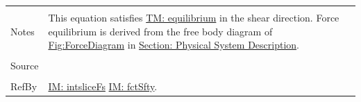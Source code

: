 \documentclass[12pt]{article}
\begin{document}
\begin{minipage}{\textwidth}
\begin{tabular}{p{} p{}}
                                 \\ \midrule \\
                                 Notes & This equation satisfies \hyperref[TM:equilibrium]{TM: equilibrium} in the shear direction. Force equilibrium is derived from the free body diagram of \hyperref[Figure:ForceDiagram]{Fig:ForceDiagram} in \hyperref[Sec:PhysSyst]{Section: Physical System Description}.
                                         \\ \midrule \\
                                         Source & \cite{chen2005}
                                                  \\ \midrule \\
                                                  RefBy & \hyperref[IM:intsliceFs]{IM: intsliceFs} \hyperref[IM:fctSfty]{IM: fctSfty}.
\\ \bottomrule \end{tabular}
\end{minipage}\\
~\newline
\end{document}
